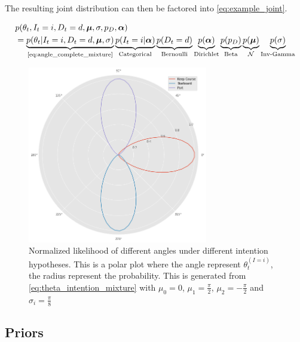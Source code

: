 The resulting joint distribution can then be factored into \cref{eq:example_joint}.

\begin{align}\label{eq:example_joint}
\begin{split}
    &p(\theta_t, I_t=i, D_t=d, \boldsymbol{\mu}, \sigma, p_D, \boldsymbol{\alpha})\\
    &= \underbrace{p(\theta_t | I_t=i, D_t=d, \boldsymbol{\mu}, \sigma)}_{\text{\cref{eq:angle_complete_mixture}}}\underbrace{p(I_t=i | \boldsymbol{\alpha})}_{\text{Categorical}}\underbrace{p(D_t=d)}_{\text{Bernoulli}}\underbrace{p(\boldsymbol{\alpha})}_{\text{Dirichlet}}\underbrace{p(p_D)}_{\text{Beta}}\underbrace{p(\boldsymbol{\mu})}_{\mathcal{N}} \underbrace{p(\sigma)}_{\text{Inv-Gamma}}
\end{split}
\end{align}


\begin{figure}
    \centering
    \includegraphics[width=0.7\textwidth]{figures/intention_angle.png}
    \caption{Normalized likelihood of different angles under different intention hypotheses. This is a polar plot where the angle represent $\theta_t^{(I=i)}$, the radius represent the probability. This is generated from \cref{eq:theta_intention_mixture} with $\mu_0=0$, $\mu_1 = \frac{\pi}{2}$, $\mu_2=-\frac{\pi}{2}$ and $\sigma_i=\frac{\pi}{8}$}
    \label{fig:intention_angle}
\end{figure}

\subsection{Priors}
